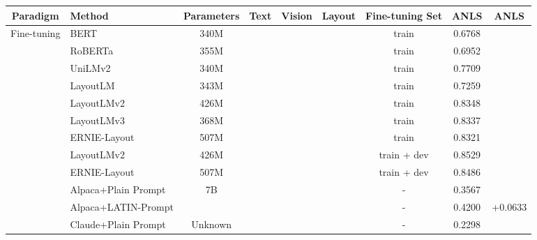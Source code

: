 \documentclass[letterpaper]{article} \usepackage{aaai24_preprint}  \usepackage{times}  \usepackage{helvet}  \usepackage{courier}  \usepackage[hyphens]{url}  \usepackage{graphicx} \urlstyle{rm} \def\UrlFont{\rm}  \usepackage{natbib}  \usepackage{caption} \frenchspacing  \setlength{\pdfpagewidth}{8.5in} \setlength{\pdfpageheight}{11in} \usepackage{algorithm}
\begin{document}
\begin{table*}[t]
\small
\centering
\begin{tabular}{@{}clccccccc@{}}
\toprule
Paradigm                      & Method                                   & Parameters               & Text         & Vision       & Layout       & Fine-tuning Set & ANLS   & ANLS \\ \midrule
\multirow{12}{*}{Fine-tuning} & BERT                    & 340M                     & &              &              & train           & 0.6768 &              \\
                              & RoBERTa                   & 355M                     &  &              &              & train           & 0.6952 &              \\
                              & UniLMv2                   & 340M                     &  &              &              & train           & 0.7709 &              \\ \cmidrule(l){2-9} 
                              & LayoutLM                 & 343M                     &  &              &  & train           & 0.7259 &              \\
                              & LayoutLMv2      & 426M                     &  &  &  & train           & 0.8348 &              \\
                              & LayoutLMv3                & 368M                     &  &  &  & train           & 0.8337 &              \\
                              & ERNIE-Layout              & 507M                     &  &  &  & train           & 0.8321 &              \\
& LayoutLMv2          & 426M                     &  &  &  & train + dev     & 0.8529 &              \\
                              & ERNIE-Layout              & 507M                     &  &  &  & train + dev     & 0.8486 &              \\
\midrule
\multirow{7}{*}{Zero-shot}    & Alpaca+Plain Prompt                    & \multirow{2}{*}{7B}      &  &              &              & -               & 0.3567 &              \\
                              & Alpaca+LATIN-Prompt                    &                          &  &              &  & -               & 0.4200 & +0.0633      \\ \cmidrule(l){2-9} 
                              & Claude+Plain Prompt                    & \multirow{2}{*}{Unknown} &  &              &              & -               & 0.2298 &              \\

\end{tabular}
\end{table*}
\end{document}
